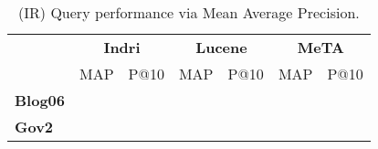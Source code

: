 \begin{table}[t]
\centering
{\small
\begin{tabular}{|l|cc|cc|cc|}
    \hline &
    \multicolumn{2}{c|}{\textbf{Indri}} &
    \multicolumn{2}{c|}{\textbf{Lucene}} &
    \multicolumn{2}{c|}{\textbf{MeTA}} \\
    & MAP & P@10 & MAP & P@10 & MAP & P@10\\
    \hline
    \textbf{Blog06} & & & & & & \\
    \textbf{Gov2} & & & & & & \\
    \hline
\end{tabular}
\caption{(IR) Query performance via Mean Average Precision.}
}
\label{table:ir-map}
\end{table}
